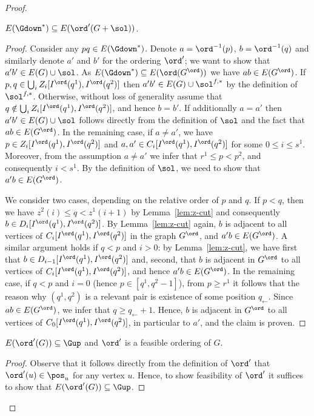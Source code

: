 \begin{proof}
\begin{claim}\label{cl:layer-two:Gdown}
$E(\Gdown^\ast) \subseteq E(\ord'(G+\sol))$.
\end{claim}
\begin{proof}
Consider any $pq \in E(\Gdown^\ast)$.
Denote $a = \ord^{-1}(p)$, $b = \ord^{-1}(q)$ and similarly denote $a'$ and $b'$ for the ordering $\ord'$; we want to show that $a'b' \in E(G) \cup \sol$.
As $E(\Gdown^\ast) \subseteq E(\ord(G^\ord))$ we have $ab \in E(G^\ord)$.
If $p,q \in \bigcup_i Z_i[I^\ord(q^1),I^\ord(q^2)]$ then $a'b' \in E(G) \cup \sol^{f,\ast}$ by the definition of $\sol^{f,\ast}$.
Otherwise, without loss of generality assume that $q \notin \bigcup_i Z_i[I^\ord(q^1),I^\ord(q^2)]$, and hence $b = b'$.
If additionally $a=a'$ then $a'b' \in E(G) \cup\sol$ follows directly from the definition of $\sol$ and the fact that $ab \in E(G^\ord)$.
In the remaining case, if $a \neq a'$, we have $p \in Z_i[I^\ord(q^1),I^\ord(q^2)]$ and $a,a' \in C_i[I^\ord(q^1),I^\ord(q^2)]$ for some
$0 \leq i \leq s^1$. Moreover, from the assumption $a \neq a'$ we infer that $r^1 \leq p < p^2$, and consequently $i < s^1$.
By the definition of $\sol$, we need to show that $a'b \in E(G^\ord)$.

We consider two cases, depending on the relative order of $p$ and $q$. If $p < q$, then we have $z^2(i) \leq q < z^1(i+1)$ by Lemma~\ref{lem:z-cut}
and consequently $b \in D_i[I^\ord(q^1),I^\ord(q^2)]$. By Lemma~\ref{lem:z-cut} again, $b$ is adjacent to all vertices of $C_i[I^\ord(q^1),I^\ord(q^2)]$
in the graph $G^\ord$, and $a'b \in E(G^\ord)$.
A similar argument holds if $q < p$ and $i > 0$: by Lemma~\ref{lem:z-cut}, we have first that $b \in D_{i-1}[I^\ord(q^1),I^\ord(q^2)]$ and, second,
that $b$ is adjacent in $G^\ord$ to all vertices of $C_i[I^\ord(q^1),I^\ord(q^2)]$, and hence $a'b \in E(G^\ord)$.
In the remaining case, if $q <p$ and $i=0$ (hence $p\in [q^1,q^2-1]$),  from $p \geq r^1$ it follows that the reason why $(q^1,q^2)$ is a relevant pair
is existence of some position $q_\leftarrow$. Since $ab \in E(G^\ord)$, we infer that $q \geq q_\leftarrow+1$. Hence, $b$ is
adjacent in $G^\ord$ to all vertices of $C_0[I^\ord(q^1),I^\ord(q^2)]$, in particular to $a'$, and the claim is proven.  
\cqed\end{proof}

\begin{claim}\label{cl:layer-two:Gup} 
$E(\ord'(G)) \subseteq \Gup$ and $\ord'$ is a feasible ordering of $G$.
\end{claim}
\begin{proof}
Observe that it follows directly from the definition of $\ord'$ that $\ord'(u) \in \pos_u$ for any vertex $u$.
Hence, to show feasibility of $\ord'$ it suffices to show that $E(\ord'(G)) \subseteq \Gup$.


\end{proof}
\end{proof}
